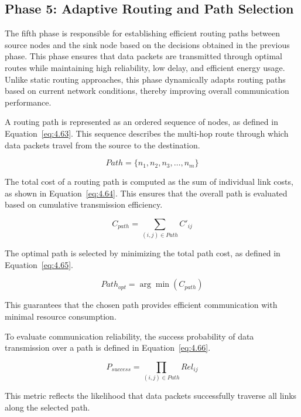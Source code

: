 \documentclass[a4paper,fleqn]{cas-dc}
\numberwithin{equation}{section}
\begin{document}
\subsection{Phase 5: Adaptive Routing and Path Selection}

The fifth phase is responsible for establishing efficient routing paths between source nodes and the sink node based on the decisions obtained in the previous phase. This phase ensures that data packets are transmitted through optimal routes while maintaining high reliability, low delay, and efficient energy usage. Unlike static routing approaches, this phase dynamically adapts routing paths based on current network conditions, thereby improving overall communication performance.

A routing path is represented as an ordered sequence of nodes, as defined in Equation~\ref{eq:4.63}. This sequence describes the multi-hop route through which data packets travel from the source to the destination.

\begin{equation}
Path = \{n_1, n_2, n_3, \dots, n_m\}
\label{eq:4.63}
\end{equation}

The total cost of a routing path is computed as the sum of individual link costs, as shown in Equation~\ref{eq:4.64}. This ensures that the overall path is evaluated based on cumulative transmission efficiency.

\begin{equation}
C_{path} = \sum_{(i,j) \in Path} C'_{ij}
\label{eq:4.64}
\end{equation}

The optimal path is selected by minimizing the total path cost, as defined in Equation~\ref{eq:4.65}.

\begin{equation}
Path_{opt} = \arg\min (C_{path})
\label{eq:4.65}
\end{equation}

This guarantees that the chosen path provides efficient communication with minimal resource consumption.

To evaluate communication reliability, the success probability of data transmission over a path is defined in Equation~\ref{eq:4.66}.

\begin{equation}
P_{success} = \prod_{(i,j) \in Path} Rel_{ij}
\label{eq:4.66}
\end{equation}

This metric reflects the likelihood that data packets successfully traverse all links along the selected path.
\end{document}
